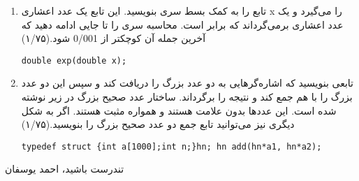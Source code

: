 \documentclass[12pt, a4paper]{article}
\begin{document}
\begin{enumerate}
\item
تابع
را به کمک بسط سری 
بنویسید. این تابع یک عدد اعشاری x را می‌گیرد و یک عدد اعشاری برمی‌گرداند که برابر
است.
 محاسبه سری را تا جایی ادامه دهید که آخرین جمله آن
کوچکتر از 0/001 شود.(۱/۷۵)
\begin{latin}
\begin{lstlisting}[numbers=none] 
double exp(double x);
\end{lstlisting}
\end{latin}

\item
تابعی بنویسید که اشاره‌گرهایی به دو عدد بزرگ را دریافت کند و سپس این دو عدد بزرگ را با هم جمع کند و نتیجه را برگرداند. ساختار عدد صحیح بزرگ در زیر نوشته شده است.
این عددها بدون علامت هستند و همواره مثبت هستند. اگر به شکل دیگری نیز می‌توانید  تابع جمع دو عدد صحیح بزرگ را بنویسید.(۱/۷۵)

\begin{latin}
\begin{lstlisting}[numbers=none] 
typedef struct {int a[1000];int n;}hn; hn add(hn*a1, hn*a2);
\end{lstlisting}
\end{latin}
\end{enumerate}
تندرست باشید، احمد یوسفان
\end{document}
